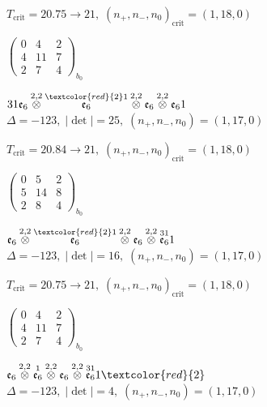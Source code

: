 \documentclass[10pt]{article}
\begin{document}
\hspace{1em}$T_{\text{crit}}=20.75 \to 21,\; (n_+,n_-,n_0)_{\text{crit}}=(1,18,0)$

\hspace{2em}$\left(\begin{smallmatrix}0 & 4 & 2 \\ 4 & 11 & 7 \\ 2 & 7 & 4\end{smallmatrix}\right)_{\!b_0}$

\smallskip

$31\mathfrak{e}_6\overset{2,2}{\otimes}\overset{\textcolor{red}{2}1}{\mathfrak{e}_6}\overset{2,2}{\otimes}\mathfrak{e}_6\overset{2,2}{\otimes}\mathfrak{e}_61$ \quad $\Delta=-123,\; |\det|=25,\; (n_+,n_-,n_0)=(1,17,0)$

\hspace{1em}$T_{\text{crit}}=20.84 \to 21,\; (n_+,n_-,n_0)_{\text{crit}}=(1,18,0)$

\hspace{2em}$\left(\begin{smallmatrix}0 & 5 & 2 \\ 5 & 14 & 8 \\ 2 & 8 & 4\end{smallmatrix}\right)_{\!b_0}$

\smallskip

$\mathfrak{e}_6\overset{2,2}{\otimes}\overset{\textcolor{red}{2}1}{\mathfrak{e}_6}\overset{2,2}{\otimes}\mathfrak{e}_6\overset{2,2}{\otimes}\overset{31}{\mathfrak{e}_6}1$ \quad $\Delta=-123,\; |\det|=16,\; (n_+,n_-,n_0)=(1,17,0)$

\hspace{1em}$T_{\text{crit}}=20.75 \to 21,\; (n_+,n_-,n_0)_{\text{crit}}=(1,18,0)$

\hspace{2em}$\left(\begin{smallmatrix}0 & 4 & 2 \\ 4 & 11 & 7 \\ 2 & 7 & 4\end{smallmatrix}\right)_{\!b_0}$

$\mathfrak{e}_6\overset{2,2}{\otimes}\overset{1}{\mathfrak{e}_6}\overset{2,2}{\otimes}\mathfrak{e}_6\overset{2,2}{\otimes}\overset{31}{\mathfrak{e}_6}1\textcolor{red}{2}$ \quad $\Delta=-123,\; |\det|=4,\; (n_+,n_-,n_0)=(1,17,0)$
\end{document}
